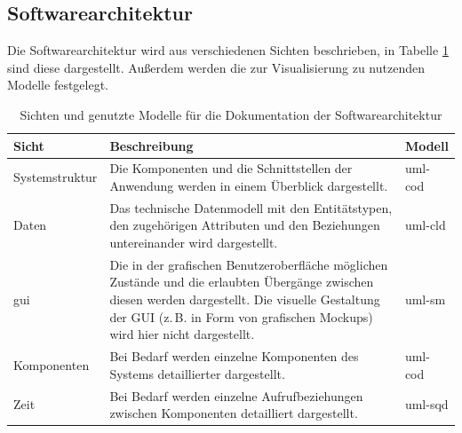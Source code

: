 \documentclass[a4paper,11pt,listof=numbered,glossary=totoc,parskip=half,toc=bib]{scrreprt}
\newcommand{\zB}{\mbox{z.\,B.}\xspace}
\begin{document}
	\subsection{Softwarearchitektur}
	\label{subsec:softwarearchitektur}
	Die Softwarearchitektur wird aus verschiedenen Sichten beschrieben, in Tabelle \ref{tab:softwarearchitektur} sind diese dargestellt. Außerdem werden die zur Visualisierung zu nutzenden Modelle festgelegt.
	
	\begin{table}
		\centering
		\begin{tabularx}{\textwidth}{lXl}
			\toprule
			\textbf{Sicht} & \textbf{Beschreibung} & \textbf{Modell} \\
			\midrule
			Systemstruktur & Die Komponenten und die Schnittstellen der Anwendung werden in einem Überblick dargestellt. & \Gls{uml}-cod \\
			Daten & Das technische Datenmodell mit den Entitätstypen, den zugehörigen Attributen und den Beziehungen untereinander wird dargestellt.  & \Gls{uml}-cld \\
			\Gls{gui} & Die in der grafischen Benutzeroberfläche möglichen Zustände und die erlaubten Übergänge zwischen diesen werden dargestellt. Die visuelle Gestaltung der GUI (\zB in Form von grafischen Mockups) wird hier nicht dargestellt. & \Gls{uml}-sm\\
			Komponenten & Bei Bedarf werden einzelne Komponenten des Systems detaillierter dargestellt. & \Gls{uml}-cod \\
			Zeit & Bei Bedarf werden einzelne Aufrufbeziehungen zwischen Komponenten detailliert dargestellt. & \Gls{uml}-sqd \\
			\bottomrule
		\end{tabularx}
		\caption{Sichten und genutzte Modelle für die Dokumentation der Softwarearchitektur}
		\label{tab:softwarearchitektur}
	\end{table}	
	
	
\end{document}
